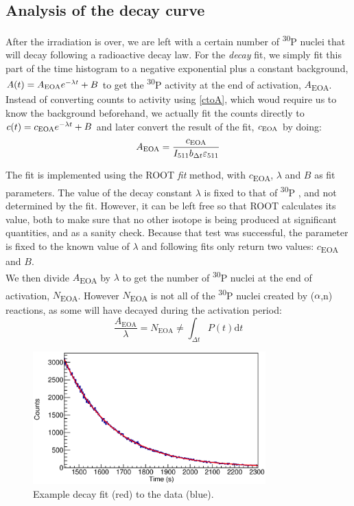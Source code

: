 \documentclass[a4paper,12pt]{report}
\newcommand{\dif}{\text{d}}
\newcommand{\an}{($\alpha$,n) }
\newcommand{\Piso}{\textsuperscript{30}P }
\begin{document}
\subsection{Analysis of the decay curve}
After the irradiation is over, we are left with a certain number of \Piso nuclei that will decay following a radioactive decay law.
For the \textit{decay} fit, we simply fit this part of the time histogram to a negative exponential plus a constant background, $A(t) = A\textsubscript{EOA} e^{-\lambda t} + B$ to get the \Piso activity at the end of activation, $A$\textsubscript{EOA}.
Instead of converting counts to activity using \ref{ctoA}, which woud require us to know the background beforehand, we actually fit the counts directly to $c(t) = c\textsubscript{EOA} e^{-\lambda t} + B$ and later convert the result of the fit, $c\textsubscript{EOA}$ by doing:
\begin{equation}
	A\textsubscript{EOA} = \frac{c\textsubscript{EOA}}{I_{511} b_{\Delta t} \varepsilon_{511}}
\end{equation}

The fit is implemented using the ROOT \textit{fit} method, with $c$\textsubscript{EOA}, $\lambda$ and $B$ as fit parameters.
The value of the decay constant $\lambda$ is fixed to that of \Piso, and not determined by the fit.
However, it can be left free so that ROOT calculates its value, both to make sure that no other isotope is being produced at significant quantities, and as a sanity check.
Because that test was successful, the parameter is fixed to the known value of $\lambda$ and following fits only return two values: $c$\textsubscript{EOA} and $B$.
\\

We then divide $A$\textsubscript{EOA} by $\lambda$ to get the number of \Piso nuclei at the end of activation, $N$\textsubscript{EOA}.
However $N$\textsubscript{EOA} is not all of the \Piso nuclei created by \an reactions, as some will have decayed during the activation period:
\[ \frac{A_\text{EOA}}{\lambda} = N_\text{EOA} \neq \int_{\Delta t}P(t) \dif t \]

\begin{figure}[H]
	\centering
	\includegraphics[width=0.80\textwidth]{example_decay_fit.eps}
	\caption{Example decay fit (red) to the data (blue).}
	\label{example_decay_fit}
\end{figure}
\end{document}
